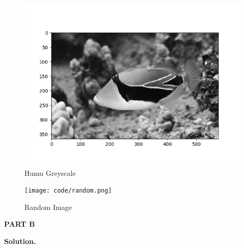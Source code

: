 \documentclass[10pt]{article}
\begin{document}
\begin{enumerate}
\begin{figure}
\end{figure}

\begin{figure}

\centering
  \includegraphics[width=\linewidth]{code/humu-gray.png}
 \caption{Humu Greyscale}
\label{label}

\end{figure}

\begin{figure}

\centering
  \texttt{[image: code/random.png]}
 \caption{Random Image}
\label{label}

\end{figure}

\newpage

\textbf{PART B}

{\bf Solution.} 


\end{enumerate}
\end{document}
